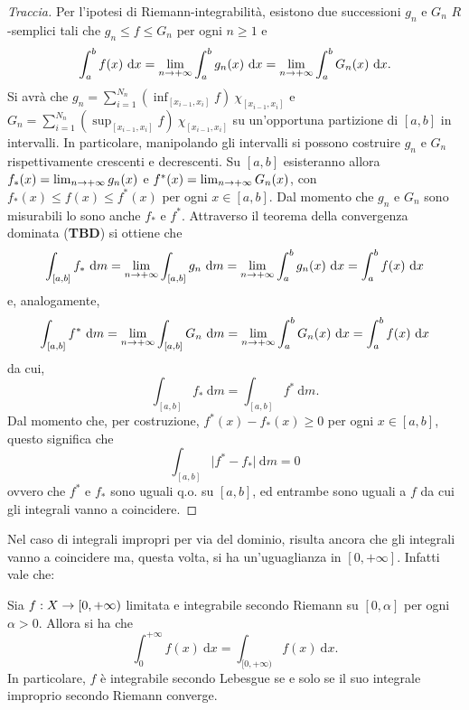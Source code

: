 \documentclass[Completo.tex]{subfiles}
\begin{document}
\begin{proof}[Traccia]
	Per l'ipotesi di Riemann-integrabilità, esistono due successioni $g_n$ e $G_n$ $R$-semplici tali che $g_n \leq f \leq G_n$ per ogni $n \geq 1$ e
	\begin{equation*}
	\int_{a}^{b} f(x) \ \mathrm{d}x = \lim_{n \rightarrow +\infty} \int_{a}^{b} g_n(x) \ \mathrm{d}x = \lim_{n \rightarrow +\infty} \int_{a}^{b} G_n(x) \ \mathrm{d}x.
	\end{equation*}
	Si avrà che $g_n = \sum_{i = 1}^{N_n} (\inf_{[x_{i-1}, x_i]} f) \ \chi_{[x_{i-1}, x_i]}$ e $G_n = \sum_{i = 1}^{N_n} (\sup_{[x_{i-1}, x_i]} f) \ \chi_{[x_{i-1}, x_i]}$ su un'opportuna partizione di $[a,b]$ in intervalli. In particolare, manipolando gli intervalli si possono costruire $g_n$ e $G_n$ rispettivamente crescenti e decrescenti. Su $[a,b]$ esisteranno allora $f_{*}(x) = \lim_{n \rightarrow +\infty} g_n(x)$ e $f^{*}(x) = \lim_{n \rightarrow +\infty} G_n(x)$, con $f_{*}(x) \leq f(x) \leq f^{*}(x)$ per ogni $x \in [a,b]$. Dal momento che $g_n$ e $G_n$ sono misurabili lo sono anche $f_{*}$ e $f^{*}$. Attraverso il teorema della convergenza dominata (\textbf{TBD}) si ottiene che
	\begin{equation*}
		\int_{[a,b]} f_{*} \ \mathrm{d}m = \lim_{n \ra +\infty} \int_{[a,b]} g_n \ \mathrm{d}m = \lim_{n \ra +\infty} \int_{a}^{b} g_n(x) \ \mathrm{d}x = \int_{a}^{b} f(x) \ \mathrm{d}x
	\end{equation*}
	e, analogamente,
	\begin{equation*}
	\int_{[a,b]} f^{*} \ \mathrm{d}m = \lim_{n \ra +\infty} \int_{[a,b]} G_n \ \mathrm{d}m = \lim_{n \ra +\infty} \int_{a}^{b} G_n(x) \ \mathrm{d}x = \int_{a}^{b} f(x) \ \mathrm{d}x
	\end{equation*}
	da cui,
	\begin{equation*}
	\int_{[a,b]} f_{*} \ \mathrm{d}m = \int_{[a,b]} f^{*} \ \mathrm{d}m.
	\end{equation*}
	Dal momento che, per costruzione, $f^{*}(x) - f_{*}(x) \geq 0$ per ogni $x \in [a,b]$, questo significa che
	\begin{equation*}
	\int_{[a,b]} \vert f^{*} - f_{*} \vert \ \mathrm{d}m = 0
	\end{equation*}
	ovvero che $f^{*}$ e $f_{*}$ sono uguali q.o. su $[a,b]$, ed entrambe sono uguali a $f$ da cui gli integrali vanno a coincidere.
\end{proof}
Nel caso di integrali impropri per via del dominio, risulta ancora che gli integrali vanno a coincidere ma, questa volta, si ha un'uguaglianza in $[0, +\infty]$. Infatti vale che:
\begin{Th}
	Sia $f: X \rightarrow [0, +\infty)$ limitata e integrabile secondo Riemann su $[0, \alpha]$ per ogni $\alpha > 0$. Allora si ha che
	\begin{equation*}
	\int_{0}^{+\infty} f(x) \ \mathrm{d}x = \int_{[0, +\infty)} f(x) \ \mathrm{d}x.
	\end{equation*}
In particolare, $f$ è integrabile secondo Lebesgue se e solo se il suo integrale improprio secondo Riemann converge.
\end{Th}
\end{document}
